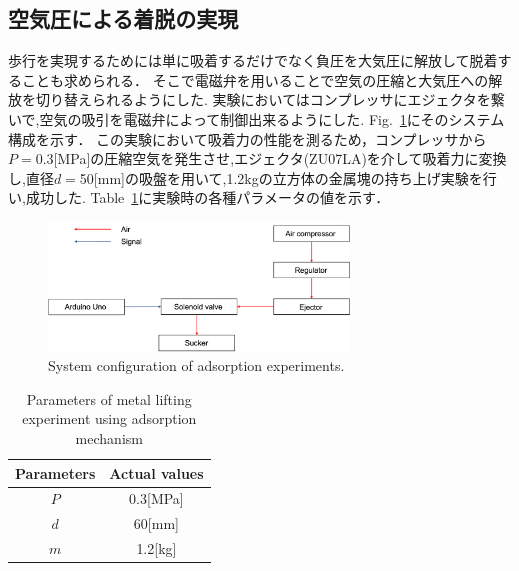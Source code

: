 \documentclass[uplatex,dvipdfmx]{jlreq}
\begin{document}
\subsection{空気圧による着脱の実現}
歩行を実現するためには単に吸着するだけでなく負圧を大気圧に解放して脱着することも求められる．
そこで電磁弁を用いることで空気の圧縮と大気圧への解放を切り替えられるようにした.
実験においてはコンプレッサにエジェクタを繋いで,空気の吸引を電磁弁によって制御出来るようにした.
Fig.~\ref{fig:System configuration for adsorption experiments}にそのシステム構成を示す．
この実験において吸着力の性能を測るため，コンプレッサから$P=0.3$[MPa]の圧縮空気を発生させ,エジェクタ(ZU07LA)を介して吸着力に変換し,直径$d=$50[mm]の吸盤を用いて,1.2kgの立方体の金属塊の持ち上げ実験を行い,成功した.
Table~\ref{table:parameters}に実験時の各種パラメータの値を示す．

\begin{figure}
    \centering
    \includegraphics[width=80mm]{./figure/System_configuration_of_adsorption_experiments.png}
    \caption{System configuration of adsorption experiments.}
    \label{fig:System configuration for adsorption experiments}
\end{figure}

\begin{table}
    \caption{Parameters of metal lifting experiment using adsorption mechanism}
     \label{table:parameters}
     \centering
     \begin{tabular}{cc}\hline
      Parameters & Actual values \\ \hline 
     $P$ & 0.3[MPa]\\ 
     $d$ & 60[mm]\\ 
     $m$ & 1.2[kg]\\\hline    
     \end{tabular}
  \end{table}
\end{document}

